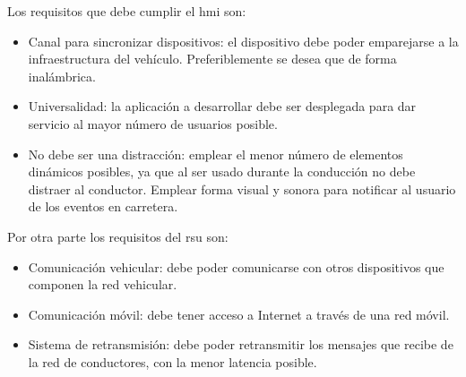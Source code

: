Los requisitos que debe cumplir el \gls{hmi} son:
\begin{itemize}
	\item Canal para sincronizar dispositivos: el dispositivo debe poder
	emparejarse a la infraestructura del vehículo. Preferiblemente se desea que
	de forma inalámbrica.

	\item Universalidad: la aplicación a desarrollar debe ser desplegada para dar
	servicio al mayor	número de usuarios posible.

	\item No debe ser una distracción: emplear el menor número de elementos
	dinámicos posibles, ya que al ser usado durante la conducción no debe
	distraer al conductor. Emplear forma visual y sonora para notificar al
	usuario de los eventos en carretera.
\end{itemize}

Por otra parte los requisitos del \gls{rsu} son:
\begin{itemize}
	\item Comunicación vehicular: debe poder comunicarse con otros dispositivos
	que componen la red vehicular.

	\item Comunicación móvil: debe tener acceso a Internet a través de una red
	móvil.

	\item Sistema de retransmisión: debe poder retransmitir los mensajes que
	recibe de la red de conductores, con la menor latencia posible.
\end{itemize}

